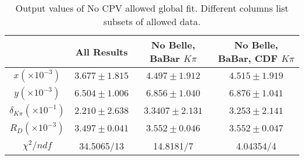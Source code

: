 \begin{table}[htdp]

\begin{center}
\begin{tabular}{|c||c||c||c|}
\hline
 & All Results & No Belle, BaBar $K\pi$ & No Belle, BaBar, CDF $K\pi$ \\ \hline
$x(\times10^{-3})$ & $3.677\pm 1.815$& $4.497\pm1.912$& $4.515\pm1.919$\\ \hline
$y(\times10^{-3})$ & $ 6.504\pm1.006$& $6.856\pm1.040$& $6.876\pm 1.041$\\ \hline
$\delta_{K\pi}(\times10^{-1})$ &$2.210\pm2.638$ &$3.3407\pm2.131$ & $3.253\pm2.141$\\ \hline
$R_D(\times10^{-3})$ &$3.497\pm 0.041$ & $3.552\pm 0.046$&$3.552\pm 0.047$ \\ \hline
$\chi^2/ndf$ &34.5065/13&14.8181/7 & 4.04354/4\\ \hline
\end{tabular}
\end{center}
\caption{Output values of No CPV allowed global fit. Different columns list subsets of
allowed data.}
\label{table:nocpv_output_table}
\end{table}%
